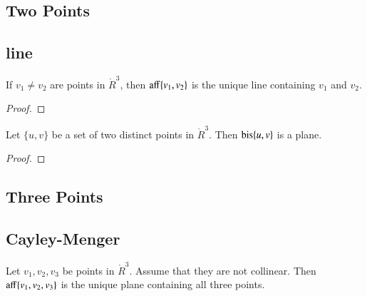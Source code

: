 \begin{tarskidata}
\begin{tarski}
\section{Two Points}
\subsection{line}

\begin{lemma}
	If $v_1\ne v_2$ are points in $\ring{R}^3$, then ${\operatorname{aff}}\{v_1,v_2\}$ is the unique
line containing $v_1$ and $v_2$.
\end{lemma}

\begin{proof}
\end{proof}
\end{tarski}





\begin{tarski}

\begin{lemma}
Let $\{u,v\}$ be a set of two distinct points in 
$\ring{R}^3$.  Then ${\operatorname{bis}}\{u,v\}$ is a plane.
\end{lemma}

\begin{proof}
\end{proof}
\end{tarski}






\begin{tarski}
\section{Three Points}
\subsection{Cayley-Menger}

\begin{lemma}
	Let $v_1,v_2,v_3$ be points in $\ring{R}^3$.  Assume that they are not collinear.
Then ${\operatorname{aff}}\{v_1,v_2,v_3\}$ is the unique plane containing all three points.
\end{lemma}


\end{tarski}
\end{tarskidata}
